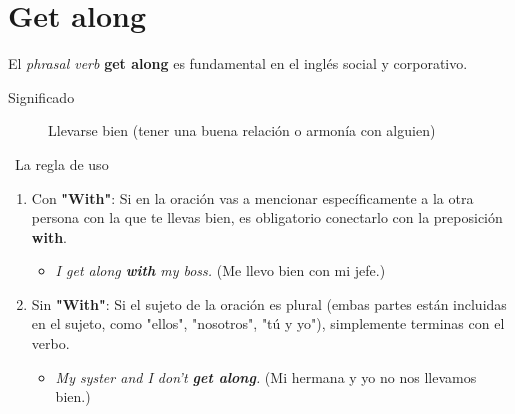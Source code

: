 \documentclass[
10pt, %
a4paper, %
oneside, %
headinclude,footinclude, %
BCOR5mm, %
]{scrartcl}
\begin{document}



\newpage %


\section{Get along}
El \textit{phrasal verb} \textbf{get along} es fundamental en el inglés social y corporativo.
\begin{description}
	\item[Significado] Llevarse bien (tener una buena relación o armonía con alguien)
\end{description}

\begin{InfoBox}{\textcolor{Goldenrod}{} \, La regla de uso} 
	\begin{enumerate}
		\item Con \textbf{"With"}: Si en la oración vas a mencionar específicamente a la otra persona con la que te llevas bien, es obligatorio conectarlo con la preposición \textbf{with}.
		\begin{itemize}
			\item \textit{I get along \textbf{with} my boss.} (Me llevo bien con mi jefe.)
		\end{itemize}
		\item Sin \textbf{"With"}: Si el sujeto de la oración es plural (embas partes están incluidas en el sujeto, como "ellos", "nosotros", "tú y yo"), simplemente terminas con el verbo.
		\begin{itemize}
			\item \textit{My syster and I don't \textbf{get along}.} (Mi hermana y yo no nos llevamos bien.)
		\end{itemize}
	\end{enumerate}
\end{InfoBox}
\end{document}
